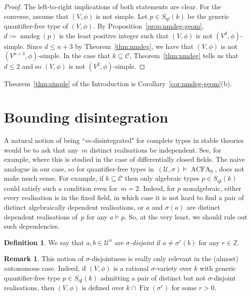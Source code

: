 \documentclass[\DocOpts]{amsart}
\theoremstyle{definition}
\newtheorem{remark}[theorem]{Remark}
\newtheorem{definition}[theorem]{Definition}
\def\fix{\operatorname{Fix}}
\def\acfa{\operatorname{ACFA}}
\def\qf{\operatorname{qf}}
\def\nmdeg{\operatorname{nmdeg}}
\def\C{\mathcal{C}}
\def\U{\mathcal{U}}
\def\ZZ{\mathbb{Z}}
\newcommand{\<}{\langle}
\renewcommand{\>}{\rangle}
\begin{document}
\begin{proof}
The left-to-right implications of both statements are clear.
For the converse, assume that $(V,\phi)$ is not simple.
Let $p\in S_{\qf}(k)$ be the generic quantifier-free type of $(V,\phi)$.
By Proposition~\ref{prop:nmdeg-geom},  $d:=\nmdeg(p)$ is the least positive integer such that $(V,\phi)$ is not $(V^d,\phi)$-simple.
Since $d\leq n+3$ by Theorem~\ref{thm:nmdeg}, we have that $(V,\phi)$ is not $(V^{n+3},\phi)$-simple.
In the case that $k\subseteq\C$, Theorem~\ref{thm:nmdeg} tells us that $d\leq 2$ and so $(V,\phi)$ is not $(V^2,\phi)$-simple.
\end{proof}

Theorem~\ref{thm:simple} of the Introduction is Corollary~\ref{cor:nmdeg-geom}(b).

\bigskip
\section{Bounding disintegration}
\label{sec:disintegration}
\noindent
A natural notion of being ``$m$-disintegrated" for complete types in stable theories would be to ask that any~$m$ distinct realisations be independent.
See,  for example, \cite[$\S$3]{c3} where this is studied in the case of differentially closed fields.
The naive analogue in our case, so for quantifier-free types in~$(\U,\sigma)\models\acfa_0$, does not make much sense.
For example, if $k\subseteq\C$ then only algebraic types $p\in S_{\qf}(k)$ could satisfy such a condition even for~$m=2$.
Indeed, for $p$ nonalgebraic, either every realisation is in the fixed field, in which case it is not hard to find a pair of distinct algebraically dependent realisations, or $a$ and $\sigma(a)$ are distinct dependent realisations of~$p$ for any $a\models p$.
So, at the very least, we should rule out such dependencies.

\begin{definition}
We say that $a,b\in\U^n$ are {\em $\sigma$-disjoint} if $a\neq\sigma^r(b)$ for any $r\in\ZZ$.
\end{definition}

\begin{remark}
\label{rem:disaut}
This notion of $\sigma$-disjointness is really only relevant in the (almost) autonomous case.
Indeed, if $(V,\phi)$ is a rational $\sigma$-variety over $k$ with generic quantifier-free type $p\in S_{\qf}(k)$ admitting a pair of distinct but not $\sigma$-disjoint realisations, then $(V,\phi)$ is defined over $k\cap\fix(\sigma^r)$ for some $r>0$.
\end{remark}
\end{document}
